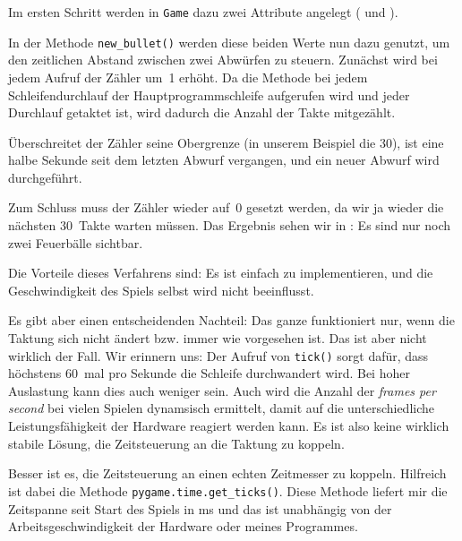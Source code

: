 Im ersten Schritt werden in \texttt{Game} dazu zwei Attribute angelegt ( und ). 



In der Methode \texttt{new\_bullet()} werden diese beiden Werte nun dazu genutzt, um den zeitlichen Abstand zwischen zwei Abwürfen zu steuern. Zunächst wird bei jedem Aufruf der Zähler um~1 erhöht. Da die Methode bei jedem Schleifendurchlauf der Hauptprogrammschleife aufgerufen wird und jeder Durchlauf getaktet ist, wird dadurch die Anzahl der Takte mitgezählt. 

Überschreitet der Zähler seine Obergrenze (in unserem Beispiel die 30), ist eine halbe Sekunde seit dem letzten Abwurf vergangen, und ein neuer Abwurf wird durchgeführt. 

Zum Schluss muss der Zähler wieder auf~0 gesetzt werden, da wir ja wieder die nächsten 30~Takte warten müssen. Das Ergebnis sehen wir in : Es sind nur noch zwei Feuerbälle sichtbar.

\newpage
{} 


Die Vorteile dieses Verfahrens sind: Es ist einfach zu implementieren, und die Geschwindigkeit des Spiels selbst wird nicht beeinflusst. 

Es gibt aber einen entscheidenden Nachteil: Das ganze funktioniert nur, wenn die Taktung sich nicht ändert bzw. immer wie vorgesehen ist. Das ist aber nicht wirklich der Fall. Wir erinnern uns: Der Aufruf von \texttt{tick()} sorgt dafür, dass höchstens 60~mal pro Sekunde die Schleife durchwandert wird. Bei hoher Auslastung kann dies auch weniger sein. Auch wird die Anzahl der \emph{frames per second} bei vielen Spielen dynamsisch ermittelt, damit auf die unterschiedliche Leistungsfähigkeit der Hardware reagiert werden kann. Es ist also keine wirklich stabile Lösung, die Zeitsteuerung an die Taktung zu koppeln. 

Besser ist es, die Zeitsteuerung an einen echten Zeitmesser zu koppeln. Hilfreich ist dabei die Methode \texttt{pygame.time.get\_ticks()}. Diese Methode liefert mir die Zeitspanne seit Start des Spiels in \gls{ms} und das ist unabhängig von der Arbeitsgeschwindigkeit der Hardware oder meines Programmes.

